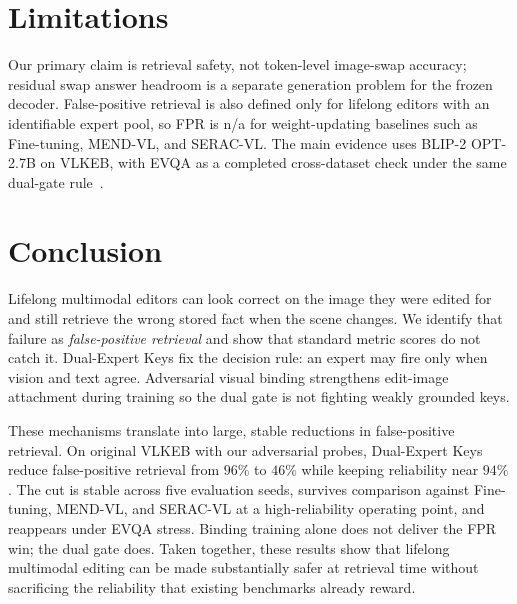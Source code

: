 \documentclass[letterpaper]{article} %
\begin{document}
\section{Limitations}
Our primary claim is retrieval safety, not token-level image-swap accuracy; residual swap answer headroom is a separate generation problem for the frozen decoder.
False-positive retrieval is also defined only for lifelong editors with an identifiable expert pool, so FPR is n/a for weight-updating baselines such as Fine-tuning, MEND-VL, and SERAC-VL.
The main evidence uses BLIP-2 OPT-2.7B on VLKEB, with EVQA as a completed cross-dataset check under the same dual-gate rule~\cite{li2023blip2,huang2024vlkeb,wang2024easyedit}.

\section{Conclusion}
Lifelong multimodal editors can look correct on the image they were edited for and still retrieve the wrong stored fact when the scene changes.
We identify that failure as \emph{false-positive retrieval} and show that standard metric scores do not catch it.
Dual-Expert Keys fix the decision rule: an expert may fire only when vision and text agree.
Adversarial visual binding strengthens edit-image attachment during training so the dual gate is not fighting weakly grounded keys.

These mechanisms translate into large, stable reductions in false-positive retrieval.
On original VLKEB with our adversarial probes, Dual-Expert Keys reduce false-positive retrieval from $96\%$ to $46\%$ while keeping reliability near $94\%$.
The cut is stable across five evaluation seeds, survives comparison against Fine-tuning, MEND-VL, and SERAC-VL at a high-reliability operating point, and reappears under EVQA stress.
Binding training alone does not deliver the FPR win; the dual gate does.
Taken together, these results show that lifelong multimodal editing can be made substantially safer at retrieval time without sacrificing the reliability that existing benchmarks already reward.




% 
\end{document}
